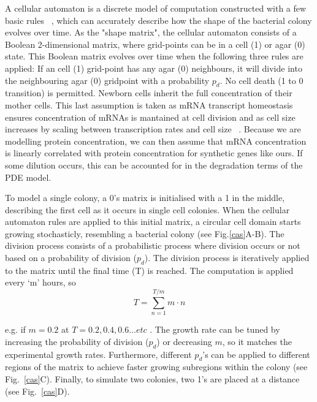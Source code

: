 A cellular automaton is a discrete model of computation constructed with a few basic rules ~\parencite{gardner1970mathematical}, which can accurately describe how the shape of the bacterial colony evolves over time.
As the "shape matrix", the cellular automaton consists of a Boolean 2-dimensional matrix, where grid-points can be in a cell (1) or agar (0) state.
This Boolean matrix evolves over time when the following three rules are applied: If an cell (1) grid-point has any agar (0) neighbours, it will divide into the neighbouring agar (0) gridpoint with a probability $p_{d}$.
No cell death (1 to 0 transition) is permitted.
Newborn cells inherit the full concentration of their mother cells.
This last assumption is taken as mRNA transcript homeostasis ensures concentration of mRNAs is mantained at cell division and as cell size increases by scaling between transcription rates and cell size ~\parencite{berry2022mechanisms,volteras2023global}.
Because we are modelling protein concentration, we can then assume that mRNA concentration is linearly correlated with protein concentration for synthetic genes like ours.
If some dilution occurs, this can be accounted for in the degradation terms of the PDE model.

To model a single colony, a 0's matrix is initialised with a 1 in the middle, describing the first cell as it occurs in single cell colonies.
When the cellular automaton rules are applied to this initial matrix, a circular cell domain starts growing stochasticly, resembling a bacterial colony (see Fig.\ref{cas}A-B).
The division process consists of a probabilistic process where division occurs or not based on a probability of division ($p_{d}$).
The division process is iteratively applied to the matrix until the final time (T) is reached.
The computation is applied every ‘m’ hours, so
\begin{equation}
        T = \sum_{n=1}^{T/m} m\cdot n
\end{equation}

e.g. if $m=0.2$ at $T=0.2, 0.4, 0.6 \ldots etc$ .
The growth rate can be tuned by increasing the probability of division ($p_d$) or decreasing $m$, so it matches the experimental growth rates. Furthermore, different $p_d$’s can be applied to different regions of the matrix to achieve faster growing subregions within the colony (see Fig.~\ref{cas}C). Finally, to simulate two colonies, two 1’s are placed at a distance (see Fig.~\ref{cas}D).

